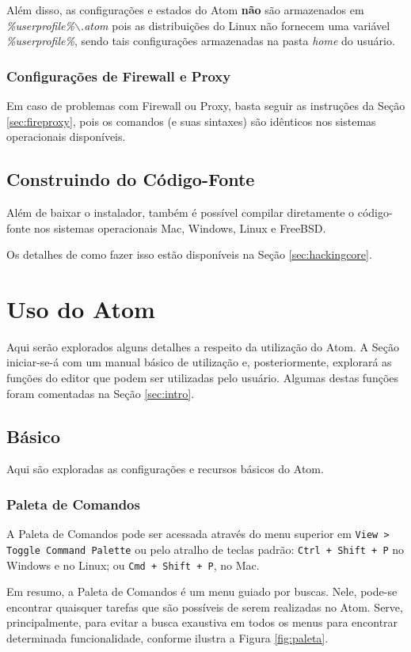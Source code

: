 	Além disso, as configurações e estados do Atom \textbf{não} são armazenados em \textit{\%userprofile\%$\backslash$.atom} pois as distribuições do Linux não fornecem uma variável \textit{\%userprofile\%}, sendo tais configurações armazenadas na pasta \textit{home} do usuário.

	\subsubsection{Configurações de Firewall e Proxy}
	Em caso de problemas com Firewall ou Proxy, basta seguir as instruções da Seção	\ref{sec:fireproxy}, pois os comandos (e suas sintaxes) são idênticos nos sistemas operacionais disponíveis.

	\subsection{Construindo do Código-Fonte}
	Além de baixar o instalador, também é possível compilar diretamente o código-fonte nos sistemas operacionais Mac, Windows, Linux e FreeBSD.

	Os detalhes de como fazer isso estão disponíveis na Seção \ref{sec:hackingcore}.

	\section{Uso do Atom}
	Aqui serão explorados alguns detalhes a respeito da utilização do Atom. A Seção iniciar-se-á com um manual básico de utilização e, posteriormente, explorará as funções do editor que podem ser utilizadas pelo usuário. Algumas destas funções foram comentadas na Seção \ref{sec:intro}.

	\subsection{Básico}
	Aqui são exploradas as configurações e recursos básicos do Atom.

	\subsubsection{Paleta de Comandos}\label{sec:commandpalette}
	A Paleta de Comandos pode ser acessada através do menu superior em \verb|View > Toggle Command Palette| ou pelo atralho de teclas padrão: \verb|Ctrl + Shift + P| no Windows e no Linux; ou \verb|Cmd + Shift + P|, no Mac.

	Em resumo, a Paleta de Comandos é um menu guiado por buscas. Nele, pode-se encontrar quaisquer tarefas que são possíveis de serem realizadas no Atom. Serve, principalmente, para evitar a busca exaustiva em todos os menus para encontrar determinada funcionalidade, conforme ilustra a Figura \ref{fig:paleta}.

